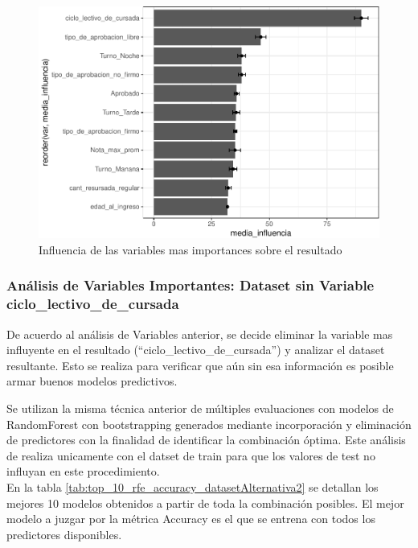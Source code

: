 \begin{figure}[!htb]
	\centering
	\includegraphics{imagenes/variables/influencia_de_variables-1.pdf}
	\caption{Influencia de las variables mas importances sobre el resultado}
	\label{fig:rfe_influencia_var}
\end{figure}

\clearpage



\subsubsection{Análisis de Variables Importantes: Dataset sin Variable ciclo\_lectivo\_de\_cursada}\label{analisis-var_importantes-2}

De acuerdo al análisis de Variables anterior, se decide eliminar la variable mas influyente en el resultado (``ciclo\_lectivo\_de\_cursada'') y analizar el dataset resultante. Esto se realiza para verificar que aún sin esa información es posible armar buenos modelos predictivos.

Se utilizan la misma técnica anterior de múltiples evaluaciones con  modelos de RandomForest con bootstrapping generados mediante incorporación y eliminación de predictores con la finalidad de identificar la combinación óptima. Este análisis de realiza unicamente con el datset de train para que los valores de test no influyan en este procedimiento.\\

En la tabla \ref{tab:top_10_rfe_accuracy_datasetAlternativa2} se detallan los mejores 10 modelos obtenidos a partir de toda la combinación posibles. El mejor modelo a juzgar por la métrica Accuracy es el que se entrena con todos los predictores disponibles.

